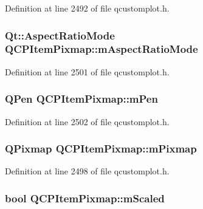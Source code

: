 Definition at line 2492 of file qcustomplot.\-h.

\hypertarget{class_q_c_p_item_pixmap_a8dc6b6c1e106ac523efae22d5fe55bab}{
\subsubsection[{m\-Aspect\-Ratio\-Mode}]{\setlength{\rightskip}{0pt plus 5cm}Qt\-::\-Aspect\-Ratio\-Mode Q\-C\-P\-Item\-Pixmap\-::m\-Aspect\-Ratio\-Mode\hspace{0.3cm}{\ttfamily [protected]}}}\label{class_q_c_p_item_pixmap_a8dc6b6c1e106ac523efae22d5fe55bab}


Definition at line 2501 of file qcustomplot.\-h.

\hypertarget{class_q_c_p_item_pixmap_acfee1124eb51a1887aaf8de10777c7a1}{
\subsubsection[{m\-Pen}]{\setlength{\rightskip}{0pt plus 5cm}Q\-Pen Q\-C\-P\-Item\-Pixmap\-::m\-Pen\hspace{0.3cm}{\ttfamily [protected]}}}\label{class_q_c_p_item_pixmap_acfee1124eb51a1887aaf8de10777c7a1}


Definition at line 2502 of file qcustomplot.\-h.

\hypertarget{class_q_c_p_item_pixmap_a1396cce7f26c7b8e9512906284380c4d}{
\subsubsection[{m\-Pixmap}]{\setlength{\rightskip}{0pt plus 5cm}Q\-Pixmap Q\-C\-P\-Item\-Pixmap\-::m\-Pixmap\hspace{0.3cm}{\ttfamily [protected]}}}\label{class_q_c_p_item_pixmap_a1396cce7f26c7b8e9512906284380c4d}


Definition at line 2498 of file qcustomplot.\-h.

\hypertarget{class_q_c_p_item_pixmap_a8fe670a529cd46a9b8afd9fc1203bc3f}{
\subsubsection[{m\-Scaled}]{\setlength{\rightskip}{0pt plus 5cm}bool Q\-C\-P\-Item\-Pixmap\-::m\-Scaled\hspace{0.3cm}{\ttfamily [protected]}}}\label{class_q_c_p_item_pixmap_a8fe670a529cd46a9b8afd9fc1203bc3f}


